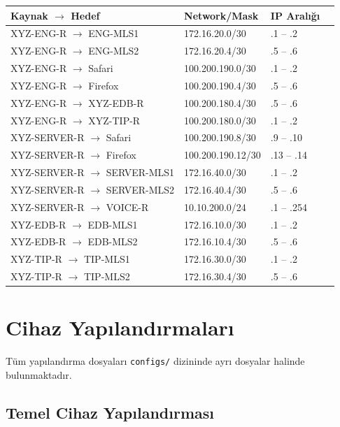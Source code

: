 \documentclass[12pt,a4paper]{article}
\begin{document}
\begin{longtable}{llll}
\toprule
\textbf{Kaynak $\rightarrow$ Hedef} & \textbf{Network/Mask} & \textbf{IP Aralığı} \\
\midrule
\endhead
XYZ-ENG-R $\rightarrow$ ENG-MLS1 & 172.16.20.0/30 & .1 -- .2 \\
XYZ-ENG-R $\rightarrow$ ENG-MLS2 & 172.16.20.4/30 & .5 -- .6 \\
XYZ-ENG-R $\rightarrow$ Safari & 100.200.190.0/30 & .1 -- .2 \\
XYZ-ENG-R $\rightarrow$ Firefox & 100.200.190.4/30 & .5 -- .6 \\
XYZ-ENG-R $\rightarrow$ XYZ-EDB-R & 100.200.180.4/30 & .5 -- .6 \\
XYZ-ENG-R $\rightarrow$ XYZ-TIP-R & 100.200.180.0/30 & .1 -- .2 \\
XYZ-SERVER-R $\rightarrow$ Safari & 100.200.190.8/30 & .9 -- .10 \\
XYZ-SERVER-R $\rightarrow$ Firefox & 100.200.190.12/30 & .13 -- .14 \\
XYZ-SERVER-R $\rightarrow$ SERVER-MLS1 & 172.16.40.0/30 & .1 -- .2 \\
XYZ-SERVER-R $\rightarrow$ SERVER-MLS2 & 172.16.40.4/30 & .5 -- .6 \\
XYZ-SERVER-R $\rightarrow$ VOICE-R & 10.10.200.0/24 & .1 -- .254 \\
XYZ-EDB-R $\rightarrow$ EDB-MLS1 & 172.16.10.0/30 & .1 -- .2 \\
XYZ-EDB-R $\rightarrow$ EDB-MLS2 & 172.16.10.4/30 & .5 -- .6 \\
XYZ-TIP-R $\rightarrow$ TIP-MLS1 & 172.16.30.0/30 & .1 -- .2 \\
XYZ-TIP-R $\rightarrow$ TIP-MLS2 & 172.16.30.4/30 & .5 -- .6 \\
\bottomrule
\end{longtable}

\newpage
\section{Cihaz Yapılandırmaları}

Tüm yapılandırma dosyaları \texttt{configs/} dizininde ayrı dosyalar halinde bulunmaktadır.

\subsection{Temel Cihaz Yapılandırması}
\end{document}
